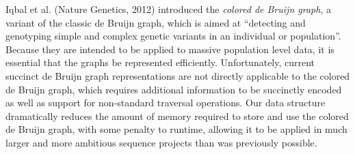 \noindent
Iqbal et al. (Nature Genetics, 2012) introduced the {\em colored de Bruijn graph}, a variant of the classic de Bruijn graph, which is aimed at ``detecting and genotyping simple and complex genetic variants in an individual or population''.
Because they are intended to be applied to massive population level data, it is essential that the graphs be represented efficiently.
Unfortunately, current succinct de Bruijn graph representations are not directly applicable to the colored de Bruijn graph, which requires additional information to be succinctly encoded as well as support for non-standard traversal operations.
Our data structure dramatically reduces the amount of memory required to store and use the colored de Bruijn graph, with some penalty to runtime, allowing it to be applied in much larger and more ambitious sequence projects than was previously possible.